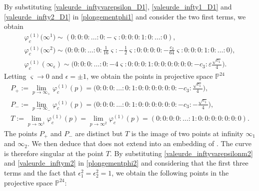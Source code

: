 \documentclass[pdftex]{sigma}
\numberwithin{equation}{section}
\begin{document}
By substituting \eqref{valeurde_inftyvarepsilon_D1},
\eqref{valeurde_infty1_D1} and \eqref{valeurde_infty2_D1} in
\eqref{plongementphi1} and consider the two first terms, we obtain
\begin{gather*}
 \varphi_c^{(1)}\bigl(\infty^1\bigr) \sim (0:0:0:\dots:0:-\varsigma:0:0:0:1:0:\dots:0),\\
\varphi_c^{(1)}\bigl(\infty^2\bigr) \sim \biggl(0:0:0:\dots:0:\frac{1}{16}\varsigma:-\frac{1}{2}\varsigma:0:0:0:0:-\frac{c_2}{64}\varsigma:0:0:0:1:0:\dots:0\biggr),\\
 \varphi_c^{(1)}(\infty_\epsilon) \sim \biggl(0:0:0:\dots:0:-4\varsigma:0:0:0:1:0:0:0:0:0:0:-c_3:\varepsilon\frac{\sqrt{c_1}}{4}\biggr).
\end{gather*}
Letting $\varsigma \rightarrow 0$ and $\epsilon=\pm 1$, we obtain
the points in projective space $\mathbb{P}^{24}$
\begin{gather*}
 P_+ :=\lim \limits_{p\rightarrow \infty_{+}}\varphi_c^{(1)}(p)
 =\biggl(0:0:0:\dots:0:1:0:0:0:0:0:0:-c_3:\frac{\sqrt{c_1}}{4}\biggr),\\
 P_- :=\lim \limits_{p\rightarrow
\infty_{-}}\varphi_c^{(1)}(p)
 =\biggl(0:0:0:\dots:0:1:0:0:0:0:0:0:-c_3:-\frac{\sqrt{c_1}}{4}\biggr),\\
 T :=\lim \limits_{p\rightarrow \infty^1}\varphi_c^{(1)}
 (p) =\lim \limits_{p\rightarrow \infty^2}\varphi_c^{(1)}(p)=
 (0:0:0:0:\dots:1:0:0:0:0:0:0:0).
\end{gather*}
The points $P_+$ and $P_-$ are distinct but $T$ is the image of two
points at infinity $\infty_{1}$ and $\infty_{2}$. We then deduce
that  does not extend into an embedding
of . The curve
 is therefore singular at the point
$T$.
 By substituting \eqref{valeurde_inftyvarepsilonm2} and
\eqref{valeurde_inftym2} in \eqref{plongementphi2} and considering
that the first three terms and the fact that
$\epsilon_1^2=\epsilon_2^2=1$, we obtain the following points in the
projective space $\mathbb{P}^{24}$:
\end{document}
